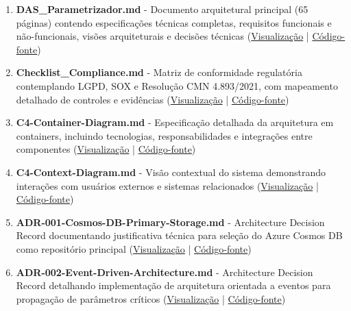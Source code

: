 \begin{enumerate}
	\item \textbf{DAS\_Parametrizador.md} - Documento arquitetural principal (65 páginas) contendo especificações técnicas completas, requisitos funcionais e não-funcionais, visões arquiteturais e decisões técnicas (\href{https://github.com/ChicoFigueiredo/puc.pr-trabalho.pos/blob/main/estudo/anexos/DAS_Parametrizador.md}{Visualização} | \href{https://github.com/ChicoFigueiredo/puc.pr-trabalho.pos/blob/main/estudo/anexos/DAS_Parametrizador.md?plain=1}{Código-fonte})
	
	\item \textbf{Checklist\_Compliance.md} - Matriz de conformidade regulatória contemplando LGPD, SOX e Resolução CMN 4.893/2021, com mapeamento detalhado de controles e evidências (\href{https://github.com/ChicoFigueiredo/puc.pr-trabalho.pos/blob/main/estudo/anexos/Compliance/Checklist_Compliance.md}{Visualização} | \href{https://github.com/ChicoFigueiredo/puc.pr-trabalho.pos/blob/main/estudo/anexos/Compliance/Checklist_Compliance.md?plain=1}{Código-fonte})
	
	\item \textbf{C4-Container-Diagram.md} - Especificação detalhada da arquitetura em containers, incluindo tecnologias, responsabilidades e integrações entre componentes (\href{https://github.com/ChicoFigueiredo/puc.pr-trabalho.pos/blob/main/estudo/anexos/Diagramas/C4-Container-Diagram.md}{Visualização} | \href{https://github.com/ChicoFigueiredo/puc.pr-trabalho.pos/blob/main/estudo/anexos/Diagramas/C4-Container-Diagram.md?plain=1}{Código-fonte})
	
	\item \textbf{C4-Context-Diagram.md} - Visão contextual do sistema demonstrando interações com usuários externos e sistemas relacionados (\href{https://github.com/ChicoFigueiredo/puc.pr-trabalho.pos/blob/main/estudo/anexos/Diagramas/C4-Context-Diagram.md}{Visualização} | \href{https://github.com/ChicoFigueiredo/puc.pr-trabalho.pos/blob/main/estudo/anexos/Diagramas/C4-Context-Diagram.md?plain=1}{Código-fonte})
	
	\item \textbf{ADR-001-Cosmos-DB-Primary-Storage.md} - Architecture Decision Record documentando justificativa técnica para seleção do Azure Cosmos DB como repositório principal (\href{https://github.com/ChicoFigueiredo/puc.pr-trabalho.pos/blob/main/estudo/anexos/ADRs/ADR-001-Cosmos-DB-Primary-Storage.md}{Visualização} | \href{https://github.com/ChicoFigueiredo/puc.pr-trabalho.pos/blob/main/estudo/anexos/ADRs/ADR-001-Cosmos-DB-Primary-Storage.md?plain=1}{Código-fonte})
	
	\item \textbf{ADR-002-Event-Driven-Architecture.md} - Architecture Decision Record detalhando implementação de arquitetura orientada a eventos para propagação de parâmetros críticos (\href{https://github.com/ChicoFigueiredo/puc.pr-trabalho.pos/blob/main/estudo/anexos/ADRs/ADR-002-Event-Driven-Architecture.md}{Visualização} | \href{https://github.com/ChicoFigueiredo/puc.pr-trabalho.pos/blob/main/estudo/anexos/ADRs/ADR-002-Event-Driven-Architecture.md?plain=1}{Código-fonte})
	
\end{enumerate}

